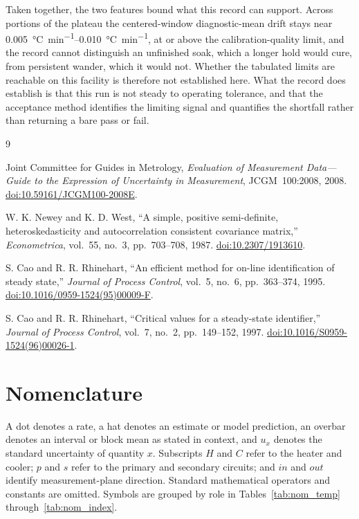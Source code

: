 \documentclass[11pt]{article}
\begin{document}
Taken together, the two features bound what this record can support. Across
portions of the plateau the centered-window diagnostic-mean drift stays near
\SIrange{0.005}{0.010}{\degreeCelsius\per min}, at or above the
calibration-quality limit, and the record cannot distinguish an unfinished soak,
which a longer hold would cure, from persistent wander, which it would not.
Whether the tabulated limits are reachable on this facility is therefore not
established here. What the record does establish is that this run is not steady
to operating tolerance, and that the acceptance method identifies the limiting
signal and quantifies the shortfall rather than returning a bare pass or fail.

\clearpage
{}
{\small
\begin{thebibliography}{9}
\setlength{\itemsep}{1.5pt}
\setlength{\parskip}{0pt}

Joint Committee for Guides in Metrology, \emph{Evaluation of Measurement Data---Guide to the Expression of Uncertainty in Measurement}, JCGM~100:2008, 2008. \href{https://doi.org/10.59161/JCGM100-2008E}{doi:10.59161/JCGM100-2008E}.

W. K. Newey and K. D. West, ``A simple, positive semi-definite, heteroskedasticity and autocorrelation consistent covariance matrix,'' \emph{Econometrica}, vol.~55, no.~3, pp.~703--708, 1987. \href{https://doi.org/10.2307/1913610}{doi:10.2307/1913610}.

S. Cao and R. R. Rhinehart, ``An efficient method for on-line identification of steady state,'' \emph{Journal of Process Control}, vol.~5, no.~6, pp.~363--374, 1995. \href{https://doi.org/10.1016/0959-1524(95)00009-F}{doi:10.1016/0959-1524(95)00009-F}.

S. Cao and R. R. Rhinehart, ``Critical values for a steady-state identifier,'' \emph{Journal of Process Control}, vol.~7, no.~2, pp.~149--152, 1997. \href{https://doi.org/10.1016/S0959-1524(96)00026-1}{doi:10.1016/S0959-1524(96)00026-1}.

\end{thebibliography}
}


\clearpage
\appendix
\section{Nomenclature}
\label{sec:nomenclature}

A dot denotes a rate, a hat denotes an estimate or model prediction, an overbar denotes an interval or block mean as stated in context, and $u_x$ denotes the standard uncertainty of quantity $x$. Subscripts $H$ and $C$ refer to the heater and cooler; $p$ and $s$ refer to the primary and secondary circuits; and $in$ and $out$ identify measurement-plane direction. Standard mathematical operators and constants are omitted. Symbols are grouped by role in Tables~\ref{tab:nom_temp} through~\ref{tab:nom_index}.
\end{document}

